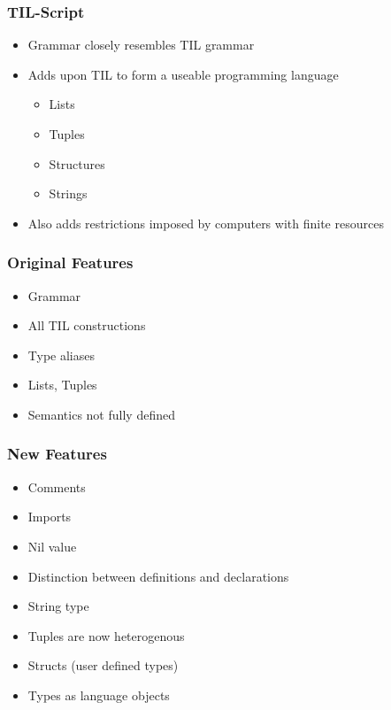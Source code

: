 \documentclass{beamer}
\begin{document}
\begin{frame}
    \frametitle{TIL-Script}
    \begin{itemize}
        \item Grammar closely resembles TIL grammar
        \item Adds upon TIL to form a useable programming language
            \begin{itemize}
                \item Lists
                \item Tuples
                \item Structures
                \item Strings
            \end{itemize}
        \item Also adds restrictions imposed by computers with finite resources
    \end{itemize}
\end{frame}

\begin{frame}
    \frametitle{Original Features}
    \begin{itemize}
        \item Grammar
        \item All TIL constructions
        \item Type aliases
        \item Lists, Tuples
        \item Semantics not fully defined
    \end{itemize}
\end{frame}

\begin{frame}
    \frametitle{New Features}
    \begin{itemize}
        \item Comments
        \item Imports
        \item Nil value
        \item Distinction between definitions and declarations
        \item String type
        \item Tuples are now heterogenous
        \item Structs (user defined types)
        \item Types as language objects
    \end{itemize}
\end{frame}
\end{document}
